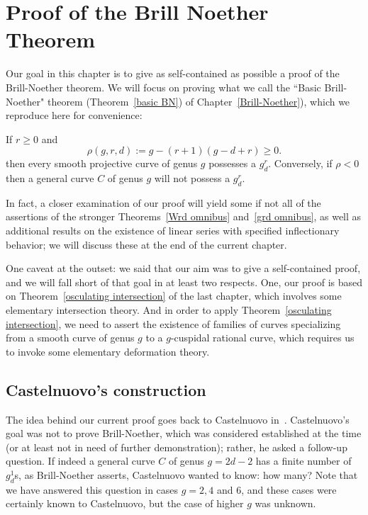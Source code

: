 

\chapter{Proof of the Brill Noether Theorem}\label{Brill Noether proof chapter}
\label{BrillNoetherproofChapter}

Our goal in this chapter is to give as self-contained as possible a proof of the Brill-Noether theorem. We will focus on proving what we call the ``Basic Brill-Noether" theorem (Theorem~\ref{basic BN}) of Chapter~\ref{Brill-Noether}), which we reproduce here for convenience:

\begin{theorem}
If $r\geq 0$ and
 $$
 \rho(g,r,d) := g - (r+1)(g-d+r) \geq 0.
$$
then every smooth projective curve of genus $g$  possesses a $g^r_d$. Conversely, if $\rho < 0$ then a general curve $C$ of genus $g$ will not possess a $g^r_d$.
\end{theorem}

In fact, a closer examination of our proof will yield some if not all of the assertions of the stronger Theorems~\ref{Wrd omnibus} and~\ref{grd omnibus}, as well as additional results on the existence of linear series with specified inflectionary behavior; we will discuss these at the end of the current chapter.

One caveat at the outset: we said that our aim was to give a self-contained proof, and we will fall short of that goal in at least two respects. One, our proof is based on Theorem~\ref{osculating intersection} of the last chapter, which involves some elementary intersection theory. And in order to apply Theorem~\ref{osculating intersection}, we need to assert the existence of families of curves specializing from a smooth curve of genus $g$ to a $g$-cuspidal rational curve, which requires us to invoke some elementary deformation theory. 

\section{Castelnuovo's construction}

The idea behind our current proof goes back to Castelnuovo in~\cite{zbMATH02692307}. Castelnuovo's goal was not to prove Brill-Noether, which was considered established at the time (or at least not in need of further demonstration); rather, he asked a follow-up question. If indeed a general curve $C$ of genus $g = 2d-2$ has a finite number of $g^1_d$s, as Brill-Noether asserts, Castelnuovo wanted to know: how many? Note that we have answered this question in cases $g = 2, 4$ and 6, and these cases were certainly known to Castelnuovo, but the case of higher $g$ was unknown.

